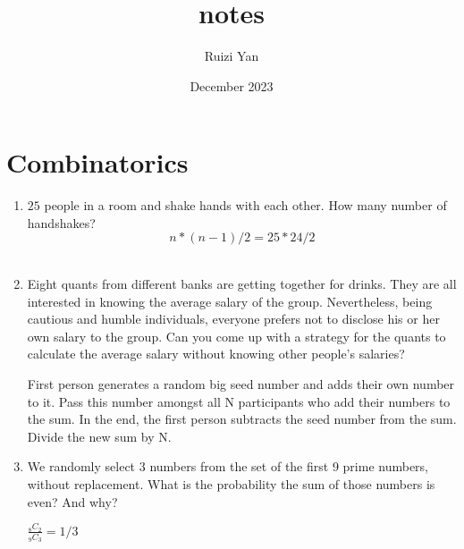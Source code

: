 \documentclass{article}
\title{notes}
\author{Ruizi Yan}
\date{December 2023}
\begin{document}
\maketitle



\section{Combinatorics}
\begin{enumerate}
    \item  $25$ people in a room and shake hands with each other. How many number of handshakes? 
    $$n*(n-1)/2 = 25*24/2$$ \\
    \item Eight quants from different banks are getting together for drinks. They are all interested in knowing the average salary of the group. Nevertheless, being cautious and humble individuals, everyone prefers not to disclose his or her own salary to the group. Can you come up with a strategy for the quants to calculate the average salary without knowing other people's salaries?

    First person generates a random big seed number and adds their own number to it. Pass this number amongst all N participants who add their numbers to the sum. In the end, the first person subtracts the seed number from the sum. Divide the new sum by N.

    \item We randomly select 3 numbers from the set of the first 9 prime numbers, without replacement. What is the probability the sum of those numbers is even? And why?

    $\frac{_8C_2}{_9C_3} = 1/3$
\end{enumerate}
\end{document}
